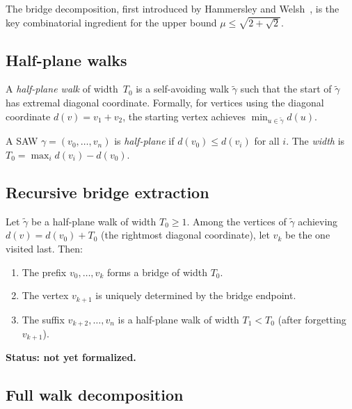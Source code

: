 The bridge decomposition, first introduced by Hammersley and Welsh~\cite{HammersleyWelsh},
is the key combinatorial ingredient for the upper bound $\mu \leq \sqrt{2+\sqrt{2}}$.

\subsection{Half-plane walks}

A \emph{half-plane walk} of width~$T_0$ is a self-avoiding walk $\tilde{\gamma}$
such that the start of $\tilde{\gamma}$ has extremal diagonal coordinate.
Formally, for vertices using the diagonal coordinate $d(v) = v_1 + v_2$, the starting
vertex achieves $\min_{u \in \tilde{\gamma}} d(u)$.

\begin{definition}\label{def:half_plane}
  A SAW $\gamma = (v_0, \ldots, v_n)$ is \emph{half-plane} if
  $d(v_0) \leq d(v_i)$ for all $i$. The \emph{width} is
  $T_0 = \max_i d(v_i) - d(v_0)$.
\end{definition}

\subsection{Recursive bridge extraction}

\begin{lemma}\label{lem:bridge_extract}
  Let $\tilde{\gamma}$ be a half-plane walk of width $T_0 \geq 1$.
  Among the vertices of $\tilde{\gamma}$ achieving $d(v) = d(v_0) + T_0$
  (the rightmost diagonal coordinate), let $v_k$ be the one visited last.
  Then:
  \begin{enumerate}
  \item The prefix $v_0, \ldots, v_k$ forms a bridge of width $T_0$.
  \item The vertex $v_{k+1}$ is uniquely determined by the bridge endpoint.
  \item The suffix $v_{k+2}, \ldots, v_n$ is a half-plane walk of width
        $T_1 < T_0$ (after forgetting $v_{k+1}$).
  \end{enumerate}
  \textbf{Status: not yet formalized.}
\end{lemma}

\subsection{Full walk decomposition}

